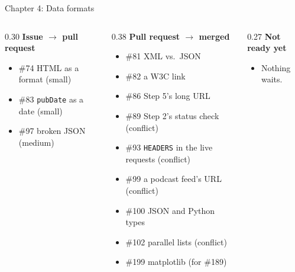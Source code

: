 \documentclass[9pt,aspectratio=169]{beamer}
\begin{document}
\begin{frame}{Chapter 4: Data formats}
    \begin{columns}[T]
        \begin{column}{0.30\textwidth}
            \textbf{Issue $\to$ pull request}
            \begin{itemize}\small
                \item \#74 HTML as a format (small)
                \item \#83 \texttt{pubDate} as a date (small)
                \item \#97 broken JSON (medium)
            \end{itemize}
        \end{column}
        \begin{column}{0.38\textwidth}
            \textbf{Pull request $\to$ merged}
            \begin{itemize}\small
                \item \#81 XML vs.\ JSON
                \item \#82 a W3C link
                \item \#86 Step 5's long URL
                \item \#89 Step 2's status check (conflict)
                \item \#93 \texttt{HEADERS} in the live requests (conflict)
                \item \#99 a podcast feed's URL (conflict)
                \item \#100 JSON and Python types
                \item \#102 parallel lists (conflict)
                \item \#199 matplotlib (for \#189)
            \end{itemize}
        \end{column}
        \begin{column}{0.27\textwidth}
            \textbf{Not ready yet}
            \begin{itemize}\small
                \item Nothing waits.
            \end{itemize}
        \end{column}
    \end{columns}
\end{frame}
\end{document}
